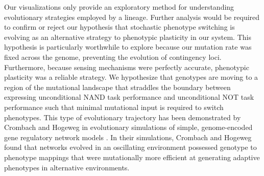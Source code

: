 Our visualizations only provide an exploratory method for understanding evolutionary strategies employed by a lineage. 
Further analysis would be required to confirm or reject our hypothesis that stochastic phenotype switching is evolving as an alternative strategy to phenotypic plasticity in our system. 
This hypothesis is particularly worthwhile to explore because our mutation rate was fixed across the genome, preventing the evolution of contingency loci.  
Furthermore, because sensing mechanisms were perfectly accurate, phenotypic plasticity was a reliable strategy. 
We hypothesize that genotypes are moving to a region of the mutational landscape that straddles the boundary between expressing unconditional NAND task performance and unconditional NOT task performance such that minimal mutational input is required to switch phenotypes. 
This type of evolutionary trajectory has been demonstrated by Crombach and Hogeweg in evolutionary simulations of simple, genome-encoded gene regulatory network models \citep{crombach_evolution_2008}.
In their simulations, Crombach and Hogeweg found that networks evolved in an oscillating environment possessed genotype to phenotype mappings that were mutationally more efficient at generating adaptive phenotypes in alternative environments. 